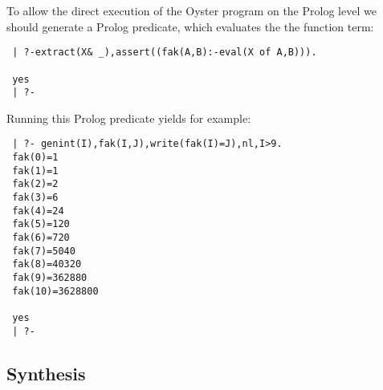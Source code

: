 \documentclass[11pt]{report}
\begin{document}
 To allow the direct execution of the Oyster program on
 the Prolog level we should generate a Prolog predicate,
 which evaluates the the function term:
 \small\begin{verbatim}
 | ?-extract(X& _),assert((fak(A,B):-eval(X of A,B))).
 
 yes
 | ?- \end{verbatim}\normalsize
 Running this Prolog predicate yields for example:
 \small\begin{verbatim}
 | ?- genint(I),fak(I,J),write(fak(I)=J),nl,I>9.
 fak(0)=1
 fak(1)=1
 fak(2)=2
 fak(3)=6
 fak(4)=24
 fak(5)=120
 fak(6)=720
 fak(7)=5040
 fak(8)=40320
 fak(9)=362880
 fak(10)=3628800
 
 yes
 | ?- \end{verbatim}\normalsize
 
 \subsection{Synthesis}
 
\end{document}
